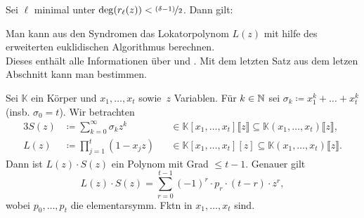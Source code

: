 \documentclass{cheat-sheet}
\newcommand{\K}{\mathbb{K}} %
\newcommand*\circled[1]{\tikz[baseline=(char.base)]{
            \node[shape=circle,draw,inner sep=1pt] (char) {\scriptsize #1};}}
\begin{document}
\begin{satz}
  Sei $\ell$ minimal unter $\deg(r_\ell (z)) < \nicefrac{(\delta - 1)}{2}$.
  Dann gilt:
  \begin{itemize}
  \end{itemize}
\end{satz}

\begin{folgerung}
  Man kann aus den Syndromen das Lokatorpolynom $L(z)$ mit hilfe des erweiterten euklidischen Algorithmus berechnen. \\
  Dieses enthält alle Informationen über \circled{1} und \circled{2}.
  Mit dem letzten Satz aus dem letzen Abschnitt kann man \circled{3} bestimmen.
\end{folgerung}



\begin{satz}
  Sei $\K$ ein Körper und $x_1, \ldots, x_t$ sowie~$z$ Variablen.
  Für $k \in \mathbb{N}$ sei
  $\sigma_k \coloneqq x_1^k + \ldots + x_t^k$ (insb. $\sigma_0 = t$).
  Wir betrachten
  \begin{alignat*}{3}
    S(z) & \coloneqq \sum_{k=0}^\infty \sigma_k z^k && \in \K [x_1, \ldots, x_t] \llbracket z \rrbracket \subseteq \K (x_1, \ldots, x_t) \llbracket z \rrbracket, \\
    L(z) & \coloneqq \prod_{j=1}^t (1 - x_j z) && \in \K [x_1, \ldots, x_t] [z] \subseteq \K (x_1, \ldots, x_t) \llbracket z \rrbracket.
  \end{alignat*}
  Dann ist $L(z) \cdot S(z)$ ein Polynom mit Grad $\leq t - 1$.
  Genauer gilt
  \[
    L(z) \cdot S(z) = \sum_{r=0}^{t-1} (-1)^{r} \cdot p_r \cdot (t - r) \cdot z^r,
  \]
  wobei $p_0, \ldots, p_t$ die elementarsymm. Fktn in $x_1, \ldots, x_t$ sind.
\end{satz}
\end{document}
